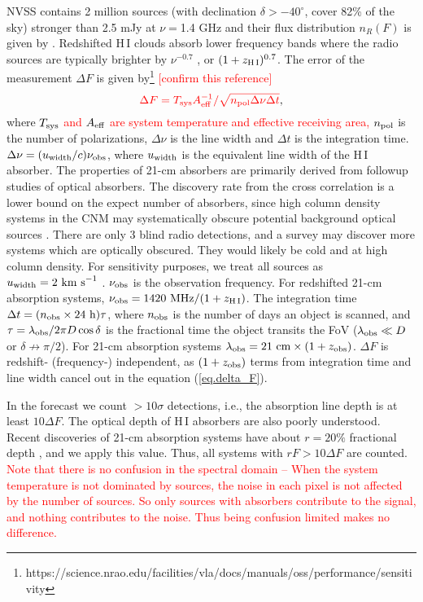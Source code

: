 \documentclass[]{raa}
\newcommand{\HI}{{H{\small\,I}}}
\newcommand{\tcr}{\textcolor{red}}
\begin{document}
NVSS contains 2 million sources (with declination $\delta >-40^\circ$,
cover 82\% of the sky) stronger than 2.5
mJy at $\nu=$1.4 GHz \citep{1998AJ....115.1693C} and their flux
distribution $n_R(F)$ is given by \cite{1984ApJ...287..461C}.
Redshifted {\HI} clouds absorb lower frequency bands where
the radio sources are typically brighter by $\nu^{-0.7}$
\citep{1998AJ....115.1693C}, or $(1+z_{\rm \HI})^{0.7}$.
The error of the measurement $\Delta F$ is given by\footnote{https://science.nrao.edu/facilities/vla/docs/manuals/oss/performance/sensitivity} \tcr{[confirm this reference]}
\begin{equation}\label{eq.delta_F}
    \tcr{\Delta F=T_{\rm sys}A_{\rm eff}^{-1}/\sqrt{n_{\rm pol}\Delta\nu\Delta t}},
\end{equation}
where
\tcr{$T_{\rm sys}$ and $A_{\rm eff}$ are system temperature and effective receiving area,}
$n_{\rm pol}$
is the number of polarizations, $\Delta\nu$ is the line width and
$\Delta t$ is the integration time. $\Delta\nu=(u_{\rm width}/c)\nu_{\rm obs}$,
where $u_{\rm width}$ is the equivalent line width of the {\HI}
absorber. The properties of 21-cm absorbers are primarily derived from
followup studies of optical absorbers. The discovery rate from the
cross correlation is a lower bound on the expect number of absorbers,
since high column density systems in the CNM may systematically
obscure potential background optical sources \citep{2014PhRvL.113d1303Y}. There are
only 3 blind radio detections, and a survey may discover more systems
which are optically obscured. They would likely be cold and at high
column density. For sensitivity purposes, we treat all sources as
$u_{\rm width}=2\ {\rm km\ s}^{-1}$
\citep{1982ApJ...259..495W,2005ARA&A..43..861W}.
$\nu_{\rm obs}$ is the observation frequency. For redshifted
21-cm absorption systems, $\nu_{\rm obs}=1420\ {\rm MHz}/(1+z_{\rm \HI})$.
The integration time $\Delta t=(n_{\rm obs}\times 24\ {\rm h})\tau$,
where $n_{\rm obs}$ is the number of days an object is scanned,
and $\tau=\lambda_{\rm obs}/2\pi D\cos\delta$ is the fractional time the object
transits the FoV ($\lambda_{\rm obs}\ll D$ or $\delta\nrightarrow\pi/2$).
For 21-cm absorption systems $\lambda_{\rm obs}=21\ {\rm cm}\times (1+z_{\rm obs})$.
$\Delta F$ is redshift- (frequency-) independent, as $(1+z_{\rm obs})$ terms
from integration time and line width cancel out
in the equation (\ref{eq.delta_F}).

In the forecast we count $>10\sigma$ detections, i.e., the absorption
line depth is at least $10\Delta F$. The optical depth of {\HI} absorbers
are also poorly understood. Recent discoveries of 21-cm absorption systems
have about $r=20\%$ fractional depth \citep{2015MNRAS.453.1249A,2015MNRAS.453.1268Z},
and we apply this value. Thus, all systems with $rF>10\Delta F$ are counted.
\tcr{Note that there is no confusion in the spectral domain -- 
When the system temperature is not dominated by sources,
the noise in each pixel is not affected by the number of sources.
So only sources with absorbers contribute to the signal, 
and nothing contributes to the noise.
Thus being confusion limited makes no difference.}
\end{document}
